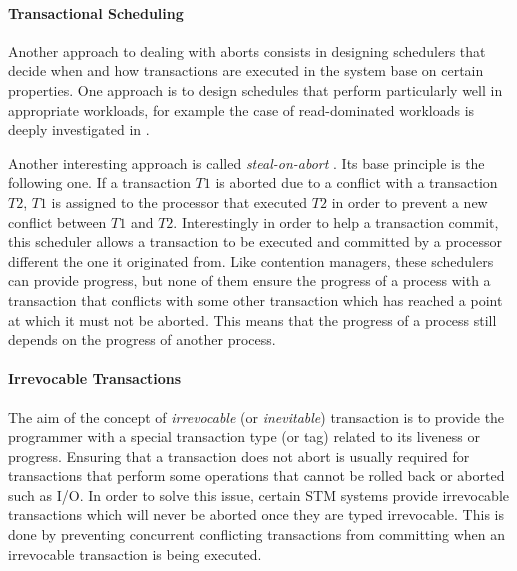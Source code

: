 \paragraph{Transactional Scheduling}
Another approach to dealing with aborts consists in designing  schedulers that decide
when and how transactions are executed in the system base on certain
properties.
One approach is to design schedules that perform 
particularly well in appropriate workloads, for example the case of
read-dominated workloads is deeply investigated in \cite{AM09}.

Another interesting approach is
called  {\it steal-on-abort} \cite{ALKJKW09}. 
Its  base principle is the  following one.  If  a transaction $T1$
is  aborted  due to  a  conflict with a transaction  $T2$,  $T1$ is
assigned to  the processor  that executed  $T2$ in order  to prevent  
a new conflict between   $T1$ and  $T2$. 
Interestingly in order to help a transaction commit,  
this scheduler allows a transaction to be executed and committed
by a processor different  the one it originated from. 
Like  contention  managers, these  schedulers  can  provide
progress,  but  none of  them  ensure  the progress  of  a  process with  a
transaction that conflicts with some  other transaction which has reached a
point at which it  must not be aborted. This means that  the  progress of a
process still  depends on the progress  of another process. 


\paragraph{Irrevocable Transactions} 
The  aim  of  the  concept   of  {\it  irrevocable}  (or  {\it  inevitable})
transaction  is  to   provide  the   programmer  with  a  special 
transaction type (or tag) related to its liveness or progress. 
%
Ensuring  that  a  transaction  does  not abort  is  usually  required  for
transactions  
that perform some operations that cannot be rolled back or aborted such as I/O.
In order to solve this issue, certain STM systems provide irrevocable 
transactions which will never be aborted once they are typed  irrevocable.
This is done by preventing concurrent conflicting transactions from 
committing when an irrevocable transaction is being executed.

